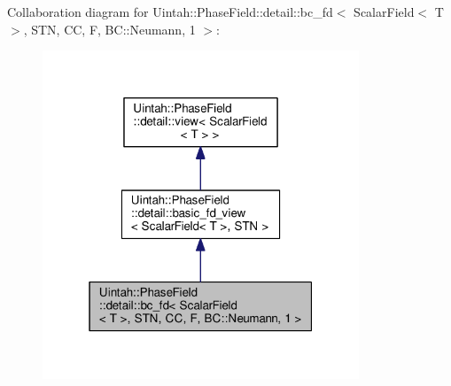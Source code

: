 Collaboration diagram for Uintah\+:\+:Phase\+Field\+:\+:detail\+:\+:bc\+\_\+fd$<$ Scalar\+Field$<$ T $>$, S\+TN, CC, F, BC\+:\+:Neumann, 1 $>$\+:\nopagebreak
\begin{figure}[H]
\begin{center}
\leavevmode
\includegraphics[width=268pt]{classUintah_1_1PhaseField_1_1detail_1_1bc__fd_3_01ScalarField_3_01T_01_4_00_01STN_00_01CC_00_01F4887c23833c4640ed778cc380166f6b2}
\end{center}
\end{figure}
